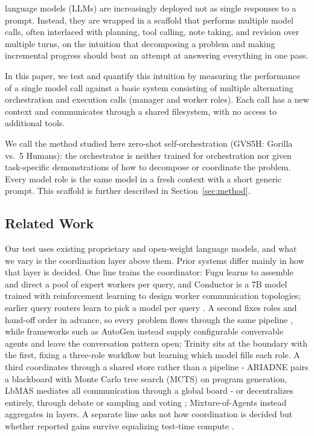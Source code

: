 \documentclass[journal]{IEEEtran}
\begin{document}
 language models (LLMs) are increasingly deployed not as single responses to a prompt. Instead, they are wrapped in a scaffold that performs multiple model calls, often interlaced with planning, tool calling, note taking,
and revision over multiple turns, on the intuition that decomposing a problem and making incremental progress should beat an attempt at answering everything in one pass.

In this paper, we test and quantify this intuition by measuring the performance of a single model call against a basic system consisting of multiple alternating orchestration and execution calls (manager and worker roles). Each call has a new context and communicates through a shared filesystem, with no access to additional tools.
 
We call the method studied here zero-shot self-orchestration (GVS5H: Gorilla vs.\ 5 Humans): the orchestrator is neither trained for orchestration nor
given task-specific demonstrations of how to decompose or coordinate the problem. Every model role is the same model in a fresh context
with a short generic prompt. This scaffold is further described in Section~\ref{sec:method}.

\subsection{Related Work}
\label{sec:related}

Our test uses existing proprietary and open-weight language models, and what
we vary is the coordination layer above them. Prior systems differ mainly in how that layer is
decided. One line trains the coordinator: Fugu \cite{sakana2026} learns to assemble
and direct a pool of expert workers per query, and Conductor \cite{nielsen2025} is a 7B
model trained with reinforcement learning to design worker communication topologies; earlier query routers learn to
pick a model per query \cite{ong2024}. A second fixes roles and hand-off order in advance,
so every problem flows through the same pipeline
\cite{hong2023,qian2023,li2023,huang2023,islam2024}, while frameworks such as AutoGen
\cite{wu2023} instead supply configurable conversable agents and leave the conversation
pattern open; Trinity \cite{xu2025} sits at the boundary with the first, fixing a
three-role workflow but learning which model fills each role. A third coordinates through a
shared store rather than a pipeline - ARIADNE \cite{wei2026} pairs a blackboard with Monte
Carlo tree search (MCTS)
on program generation, LbMAS \cite{han2025} mediates all communication through a global
board - or decentralizes entirely, through debate \cite{du2023} or sampling and voting
\cite{li2024}; Mixture-of-Agents \cite{wangj2024a} instead aggregates in layers. A
separate line asks not how coordination is decided but whether reported gains survive
equalizing test-time compute \cite{wangj2024b,tran2026}.
\end{document}
